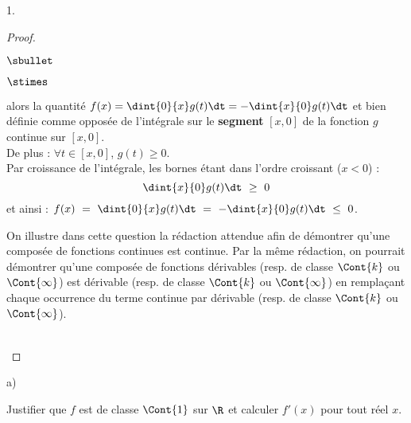 \documentclass[11pt]{article}%
\begin{document}
\begin{noliste}{1.}
\begin{proof}
\begin{noliste}{$\sbullet$}
\begin{noliste}{$\stimes$}
      \item {} alors la quantité $f(x) =
        \dint{0}{x} g(t) \dt = - \dint{x}{0} g(t) \dt$ et bien définie
        comme opposée de l'intégrale sur le {\bf segment} $[x, 0]$ de
        la fonction $g$ continue sur $[x, 0]$.\\
        De plus : $\forall t \in [x, 0]$, $g(t) \geq 0$.\\[.2cm]
        Par croissance de l'intégrale, les bornes étant dans l'ordre
        croissant ($x < 0$) :
        \[
        \dint{x}{0} g(t) \dt \ \geq \ 0
        \]
        et ainsi : $f(x) \ = \ \dint{0}{x} g(t) \dt \ = \ -
        \dint{x}{0} g(t) \dt \ \leq \ 0$. %
      \end{noliste}      
    \end{noliste}
    \begin{remarkL}{.97}%
      On illustre dans cette question la rédaction attendue afin de
      démontrer qu'une composée de fonctions continues est
      continue. Par la même rédaction, on pourrait démontrer qu'une
      composée de fonctions dérivables (resp. de classe $\Cont{k}$ ou
      $\Cont{\infty}$) est dérivable (resp. de classe $\Cont{k}$ ou
      $\Cont{\infty}$) en remplaçant chaque occurrence du terme \og
      continue \fg{} par dérivable (resp. de classe $\Cont{k}$ ou
      $\Cont{\infty}$).
    \end{remarkL}~\\[-1.3cm]
  \end{proof}


  \newpage

  
  \begin{noliste}{a)}
    \setlength{\itemsep}{2mm} %
    \setcounter{enumii}{1}
  \item Justifier que $f$ est de classe $\Cont{1}$ sur $\R$ et
    calculer $f'(x)$ pour tout réel $x$.
    

\end{noliste}
\end{noliste}
\end{document}
